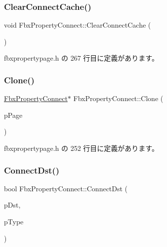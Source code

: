 \subsubsection{\texorpdfstring{Clear\+Connect\+Cache()}{ClearConnectCache()}}
{\footnotesize\ttfamily void Fbx\+Property\+Connect\+::\+Clear\+Connect\+Cache (\begin{DoxyParamCaption}{ }\end{DoxyParamCaption})\hspace{0.3cm}{\ttfamily [inline]}}



 fbxpropertypage.\+h の 267 行目に定義があります。

\mbox{\label{class_fbx_property_connect_aff713a2a67f9a1cfb0ecad7e548304ea}} 
\subsubsection{\texorpdfstring{Clone()}{Clone()}}
{\footnotesize\ttfamily \hyperlink{class_fbx_property_connect}{Fbx\+Property\+Connect}$\ast$ Fbx\+Property\+Connect\+::\+Clone (\begin{DoxyParamCaption}\item[{\hyperlink{class_fbx_property_page}{Fbx\+Property\+Page} $\ast$}]{p\+Page }\end{DoxyParamCaption})\hspace{0.3cm}{\ttfamily [inline]}}



 fbxpropertypage.\+h の 252 行目に定義があります。

\mbox{\label{class_fbx_property_connect_a9d8f3384bbc9516b873a081f1f328213}} 
\subsubsection{\texorpdfstring{Connect\+Dst()}{ConnectDst()}}
{\footnotesize\ttfamily bool Fbx\+Property\+Connect\+::\+Connect\+Dst (\begin{DoxyParamCaption}\item[{\hyperlink{class_fbx_property_connect}{Fbx\+Property\+Connect} $\ast$}]{p\+Dst,  }\item[{\hyperlink{class_fbx_connection_a3df448a5db356652ab99fd2be2553749}{Fbx\+Connection\+::\+E\+Type}}]{p\+Type }\end{DoxyParamCaption})\hspace{0.3cm}{\ttfamily [inline]}}



